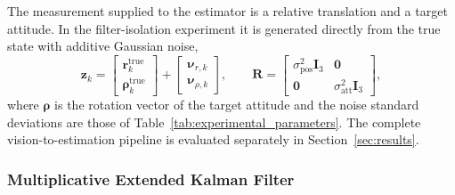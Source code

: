 The measurement supplied to the estimator is a relative translation and a
target attitude. In the filter-isolation experiment it is generated directly
from the true state with additive Gaussian noise,
\begin{equation}
    \mathbf{z}_{k}
    =
    \begin{bmatrix}
        \mathbf{r}_{k}^{\mathrm{true}}\\
        \boldsymbol{\rho}_{k}^{\mathrm{true}}
    \end{bmatrix}
    +
    \begin{bmatrix}
        \boldsymbol{\nu}_{r,k}\\ \boldsymbol{\nu}_{\rho,k}
    \end{bmatrix},
    \qquad
    \mathbf{R}
    =
    \begin{bmatrix}
        \sigma_{\mathrm{pos}}^{2}\mathbf{I}_{3} & \mathbf{0}\\
        \mathbf{0} & \sigma_{\mathrm{att}}^{2}\mathbf{I}_{3}
    \end{bmatrix},
\end{equation}
where $\boldsymbol{\rho}$ is the rotation vector of the target attitude and
the noise standard deviations are those of
Table~\ref{tab:experimental_parameters}. The complete vision-to-estimation
pipeline is evaluated separately in Section~\ref{sec:results}.

\subsubsection{Multiplicative Extended Kalman Filter}

